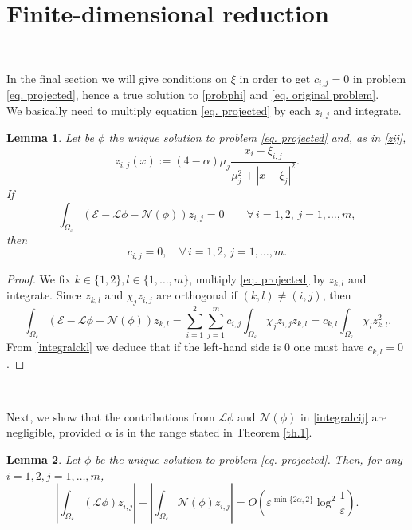 \documentclass[11pt]{article}
\newtheorem{lemma}{Lemma}[section]
\begin{document}
\section{Finite-dimensional reduction}\

In the final section we will give conditions on $\xi$ in order to get $c_{i,j}=0$ in problem \eqref{eq. projected}, hence a true solution to \eqref{probphi} and \eqref{eq. original problem}.\\
We basically need to multiply equation \eqref{eq. projected} by each $z_{i,j}$ and integrate.

\begin{lemma}\label{le. c=0}
Let be $\phi$ the unique solution to problem \eqref{eq. projected} and, as in \eqref{zij},
$$z_{i,j}(x):=(4-\alpha)\mu_j\frac{x_i-\xi_{i,j}}{\mu_j^2+\left|x-\xi_j\right|^2}.$$
If
\begin{equation}\label{integralcij}
\int_{\Omega_\varepsilon}(\mathcal E-\mathcal L\phi-\mathcal N(\phi))z_{i,j}=0\qquad\forall\,i=1,2,\,j=1,\dots,m,
\end{equation}
then
$$c_{i,j}=0,\quad\forall\,i=1,2,\,j=1,\dots,m.$$
\end{lemma}

\begin{proof} We fix $k\in\{1,2\},l\in\{1,\dots,m\}$, multiply \eqref{eq. projected} by $z_{k,l}$ and integrate. Since $z_{k,l}$ and $\chi_jz_{i,j}$ are orthogonal if $(k,l)\ne(i,j)$, then
$$\int_{\Omega_\varepsilon}(\mathcal E-\mathcal L\phi-\mathcal N(\phi))z_{k,l}=\sum_{i=1}^2\sum_{j=1}^mc_{i,j}\int_{\Omega_\varepsilon}\chi_jz_{i,j}z_{k,l}=c_{k,l}\int_{\Omega_\varepsilon}\chi_lz_{k,l}^2.$$
From \eqref{integralckl} we deduce that if the left-hand side is $0$ one must have $c_{k,l}=0$.
\end{proof}\

Next, we show that the contributions from $\mathcal L\phi$ and $\mathcal N(\phi)$ in \eqref{integralcij} are negligible, provided $\alpha$ is in the range stated in Theorem \ref{th.1}.

\begin{lemma}\label{estimateLN}
Let $\phi$ be the unique solution to problem \eqref{eq. projected}. Then, for any $i=1,2,j=1,\dots,m$,
$$\left|\int_{\Omega_\varepsilon}(\mathcal L\phi)z_{i,j}\right|+\left|\int_{\Omega_\varepsilon}\mathcal N(\phi)z_{i,j}\right|=O\left(\varepsilon^{\min\{2\alpha,2\}}\log^2\frac1\varepsilon\right).$$
\end{lemma}
\end{document}

